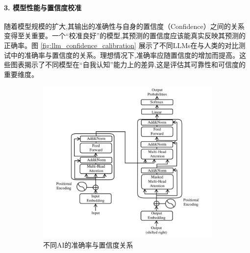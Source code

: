 \paragraph{3. 模型性能与置信度校准}
随着模型规模的扩大,其输出的准确性与自身的置信度（Confidence）之间的关系变得至关重要。一个“校准良好”的模型,其预测的置信度应该能真实反映其预测的正确率。图 \ref{fig:llm_confidence_calibration} 展示了不同LLMs在与人类的对比测试中的准确率与置信度的关系。理想情况下,准确率应随置信度的增加而提高。这些图表揭示了不同模型在“自我认知”能力上的差异,这是评估其可靠性和可信度的重要维度。
\begin{figure}[htbp]
    \centering
    \begin{subfigure}[b]{0.48\textwidth}
        \centering
        \includegraphics[width=\textwidth]{figures/LLM3.png}
        \caption{不同AI的准确率与置信度关系}
        \label{fig:llm_accuracy_confidence}
    \end{subfigure}
    \hfill
    \begin{subfigure}[b]{0.48\textwidth}
        \centering

\end{subfigure}
\end{figure}
